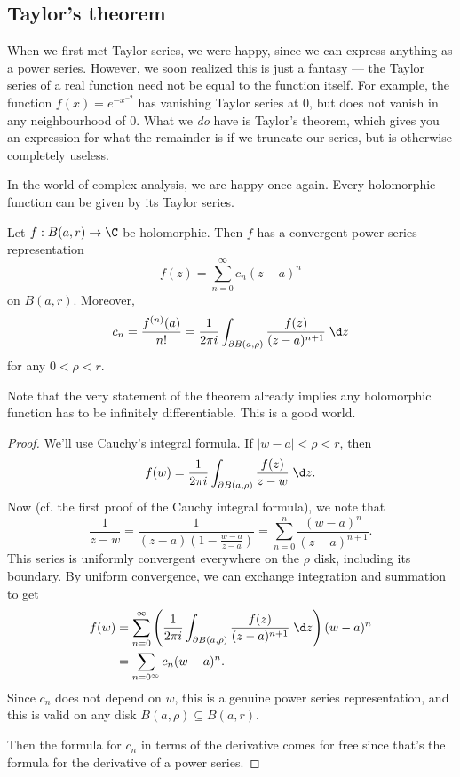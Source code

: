 \documentclass[a4paper]{article}
\begin{document}
\subsection{Taylor's theorem}
When we first met Taylor series, we were happy, since we can express anything as a power series. However, we soon realized this is just a fantasy --- the Taylor series of a real function need not be equal to the function itself. For example, the function $f(x) = e^{-x^{-2}}$ has vanishing Taylor series at $0$, but does not vanish in any neighbourhood of $0$. What we \emph{do} have is Taylor's theorem, which gives you an expression for what the remainder is if we truncate our series, but is otherwise completely useless.

In the world of complex analysis, we are happy once again. Every holomorphic function can be given by its Taylor series.
\begin{thm}
  Let $f: B(a, r) \to \C$ be holomorphic. Then $f$ has a convergent power series representation
  \[
    f(z) = \sum_{n = 0}^\infty c_n (z - a)^n
  \]
  on $B(a, r)$. Moreover,
  \[
    c_n = \frac{f^{(n)}(a)}{n!} = \frac{1}{2\pi i}\int_{\partial B(a, \rho)}\frac{f(z)}{(z - a)^{n + 1}}\;\d z
  \]
  for any $0 < \rho < r$.
\end{thm}
Note that the very statement of the theorem already implies any holomorphic function has to be infinitely differentiable. This is a good world.

\begin{proof}
  We'll use Cauchy's integral formula. If $|w - a|< \rho < r$, then
  \[
    f(w) = \frac{1}{2\pi i} \int_{\partial B(a, \rho)} \frac{f(z)}{z - w}\;\d z.
  \]
  Now (cf. the first proof of the Cauchy integral formula), we note that
  \[
    \frac{1}{z - w} = \dfrac{1}{(z - a)\left(1 - \frac{w - a}{z - a}\right)} = \sum_{n = 0}^n \frac{(w - a)^n}{(z - a)^{n + 1}}.
  \]
  This series is uniformly convergent everywhere on the $\rho$ disk, including its boundary. By uniform convergence, we can exchange integration and summation to get
  \begin{align*}
    f(w) &= \sum_{n = 0}^\infty \left(\frac{1}{2\pi i} \int_{\partial B(a, \rho)} \frac{f(z)}{(z - a)^{n + 1}}\;\d z\right) (w - a)^n\\
    &= \sum_{n = 0^\infty} c_n (w - a)^n.
  \end{align*}
  Since $c_n$ does not depend on $w$, this is a genuine power series representation, and this is valid on any disk $B(a, \rho) \subseteq B(a, r)$.

  Then the formula for $c_n$ in terms of the derivative comes for free since that's the formula for the derivative of a power series.
\end{proof}
\end{document}
